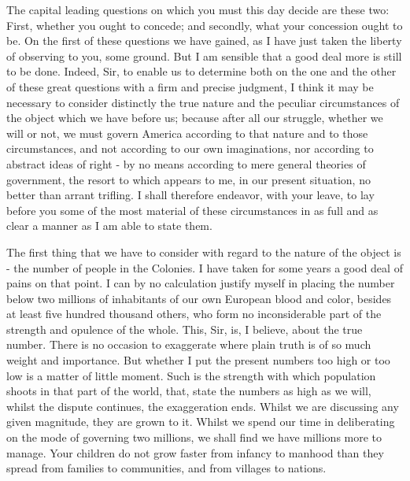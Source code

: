 The capital leading questions on which you must this day decide are these two: First, whether you ought to concede; and secondly, what your concession ought to be. On the first of these questions we have gained, as I have just taken the liberty of observing to you, some ground. But I am sensible that a good deal more is still to be done. Indeed, Sir, to enable us to determine both on the one and the other of these great questions with a firm and precise judgment, I think it may be necessary to consider distinctly the true nature and the peculiar circumstances of the object which we have before us; because after all our struggle, whether we will or not, we must govern America according to that nature and to those circumstances, and not according to our own imaginations, nor according to abstract ideas of right - by no means according to mere general theories of government, the resort to which appears to me, in our present situation, no better than arrant trifling. I shall therefore endeavor, with your leave, to lay before you some of the most material of these circumstances in as full and as clear a manner as I am able to state them.\par

The first thing that we have to consider with regard to the nature of the object is - the number of people in the Colonies. I have taken for some years a good deal of pains on that point. I can by no calculation justify myself in placing the number below two millions of inhabitants of our own European blood and color, besides at least five hundred thousand others, who form no inconsiderable part of the strength and opulence of the whole. This, Sir, is, I believe, about the true number. There is no occasion to exaggerate where plain truth is of so much weight and importance. But whether I put the present numbers too high or too low is a matter of little moment. Such is the strength with which population shoots in that part of the world, that, state the numbers as high as we will, whilst the dispute continues, the exaggeration ends. Whilst we are discussing any given magnitude, they are grown to it. Whilst we spend our time in deliberating on the mode of governing two millions, we shall find we have millions more to manage. Your children do not grow faster from infancy to manhood than they spread from families to communities, and from villages to nations.\par

